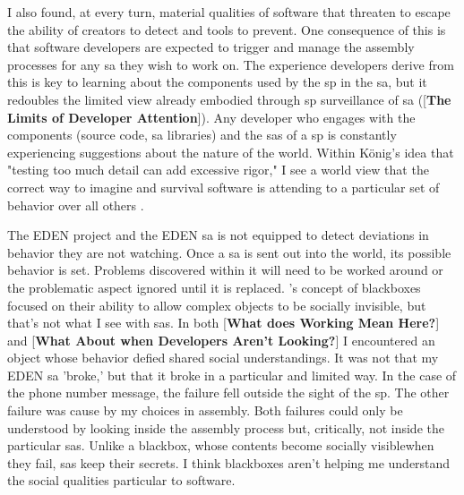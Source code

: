\documentclass[a4paper,man,natbib,floatsintext]{apa6}
\begin{document}
  I also found, at every turn, material qualities of software that threaten to escape the ability of creators to detect and tools to prevent. One consequence of this is that software developers are expected to trigger and manage the assembly processes for any \gls{sa} they wish to work on. The experience developers derive from this is key to learning about the components used by the \gls{sp} in the \gls{sa}, but it redoubles the limited view already embodied through \gls{sp} surveillance of \gls{sa} ([\textbf{The Limits of Developer Attention}]). Any developer who engages with the components (source code, \gls{sa} libraries) and the \glspl{sa} of a \gls{sp} is constantly experiencing suggestions about the nature of the world. Within König's idea that "testing too much detail can add excessive rigor," I see a world view that the correct way to imagine and survival software is attending to a particular set of behavior over all others \citep{Konig2020-yx}.

  The \gls{EDEN} project and the \gls{EDEN} \gls{sa} is not equipped to detect deviations in behavior they are not watching. Once a \gls{sa} is sent out into the world, its possible behavior is set. Problems discovered within it will need to be worked around or the problematic aspect ignored until it is replaced. \citet{Latour1999-ui}'s concept of blackboxes focused on their ability to allow complex objects to be socially invisible, but that's not what I see with \glspl{sa}. In both [\textbf{What does Working Mean Here?}] and [\textbf{What About when Developers Aren't Looking?}] I encountered an object whose behavior defied shared social understandings. It was not that my \gls{EDEN} \gls{sa} 'broke,' but that it broke in a particular and limited way. In the case of the phone number message, the failure fell outside the sight of the \gls{sp}. The other failure was cause by my choices in assembly. Both failures could only be understood by looking inside the assembly process but, critically, not inside the particular \glspl{sa}. Unlike a blackbox, whose contents become socially visible\footnotemark when they fail, \glspl{sa} keep their secrets. I think blackboxes aren't helping me understand the social qualities particular to software. 

\end{document}
